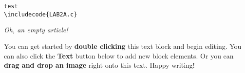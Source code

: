 \begin{lstlisting}[frame=single]  % Start your code-block
test
\includecode{LAB2A.c}
\end{lstlisting}



\textit{Oh, an empty article!} 

You can get started by \textbf{double clicking} this text block and begin editing. You can also click the \textbf{Text} button below to add new block elements. Or you can \textbf{drag and drop an image} right onto this text. Happy writing!
